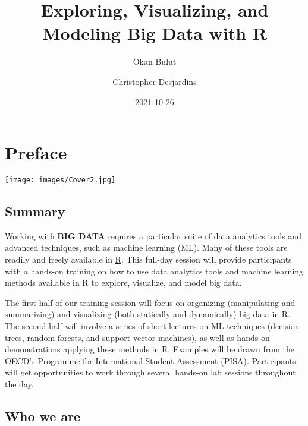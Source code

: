 \documentclass[
]{book}
\title{Exploring, Visualizing, and Modeling Big Data with R}
\author{Okan Bulut \and Christopher Desjardins}
\date{2021-10-26}
\begin{document}
\maketitle

{
\setcounter{tocdepth}{1}
\tableofcontents
}
\hypertarget{preface}{%
\chapter{Preface}\label{preface}}

\texttt{[image: images/Cover2.jpg]}

\hypertarget{summary}{%
\section{Summary}\label{summary}}

Working with \textbf{BIG DATA} requires a particular suite of data analytics tools and advanced techniques, such as machine learning (ML). Many of these tools are readily and freely available in \href{https://cran.r-project.org/}{R}. This full-day session will provide participants with a hands-on training on how to use data analytics tools and machine learning methods available in R to explore, visualize, and model big data.

The first half of our training session will focus on organizing (manipulating and summarizing) and visualizing (both statically and dynamically) big data in R. The second half will involve a series of short lectures on ML techniques (decision trees, random forests, and support vector machines), as well as hands-on demonstrations applying these methods in R. Examples will be drawn from the OECD's \href{http://www.oecd.org/pisa/}{Programme for International Student Assessment (PISA)}. Participants will get opportunities to work through several hands-on lab sessions throughout the day.

\hypertarget{who-we-are}{%
\section{Who we are}\label{who-we-are}}
\end{document}
